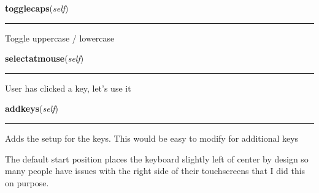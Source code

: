     \vspace{0.5ex}

\hspace{.8\funcindent}\begin{boxedminipage}{\funcwidth}

    \raggedright \textbf{togglecaps}(\textit{self})

    \vspace{-1.5ex}

    \rule{\textwidth}{0.5\fboxrule}
\setlength{\parskip}{2ex}
    Toggle uppercase / lowercase

\setlength{\parskip}{1ex}
    \end{boxedminipage}

    \label{pygame-asteroids:virtual_keyboard:VirtualKeyboard:selectatmouse}

    \vspace{0.5ex}

\hspace{.8\funcindent}\begin{boxedminipage}{\funcwidth}

    \raggedright \textbf{selectatmouse}(\textit{self})

    \vspace{-1.5ex}

    \rule{\textwidth}{0.5\fboxrule}
\setlength{\parskip}{2ex}
    User has clicked a key, let's use it

\setlength{\parskip}{1ex}
    \end{boxedminipage}

    \label{pygame-asteroids:virtual_keyboard:VirtualKeyboard:addkeys}

    \vspace{0.5ex}

\hspace{.8\funcindent}\begin{boxedminipage}{\funcwidth}

    \raggedright \textbf{addkeys}(\textit{self})

    \vspace{-1.5ex}

    \rule{\textwidth}{0.5\fboxrule}
\setlength{\parskip}{2ex}
    Adds the setup for the keys.  This would be easy to modify for 
    additional keys

    The default start position places the keyboard slightly left of center 
    by design so many people have issues with the right side of their 
    touchscreens that I did this on purpose.

\setlength{\parskip}{1ex}
    \end{boxedminipage}

